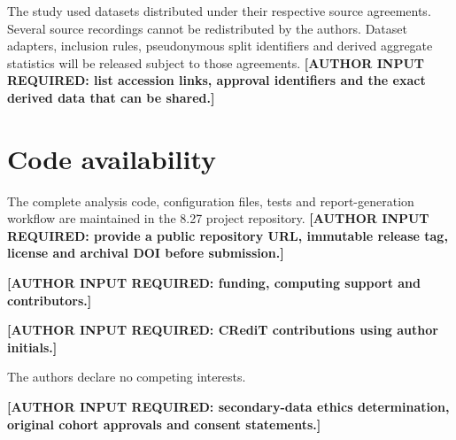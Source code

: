 \documentclass[pdflatex,sn-nature]{sn-jnl}
\begin{document}
The study used datasets distributed under their respective source agreements. Several source recordings cannot be redistributed by the authors. Dataset adapters, inclusion rules, pseudonymous split identifiers and derived aggregate statistics will be released subject to those agreements. \textbf{[AUTHOR INPUT REQUIRED: list accession links, approval identifiers and the exact derived data that can be shared.]}

\section*{Code availability}

The complete analysis code, configuration files, tests and report-generation workflow are maintained in the 8.27 project repository. \textbf{[AUTHOR INPUT REQUIRED: provide a public repository URL, immutable release tag, license and archival DOI before submission.]}

\backmatter

\textbf{[AUTHOR INPUT REQUIRED: funding, computing support and contributors.]}

\textbf{[AUTHOR INPUT REQUIRED: CRediT contributions using author initials.]}

The authors declare no competing interests.

\textbf{[AUTHOR INPUT REQUIRED: secondary-data ethics determination, original cohort approvals and consent statements.]}


\end{document}
